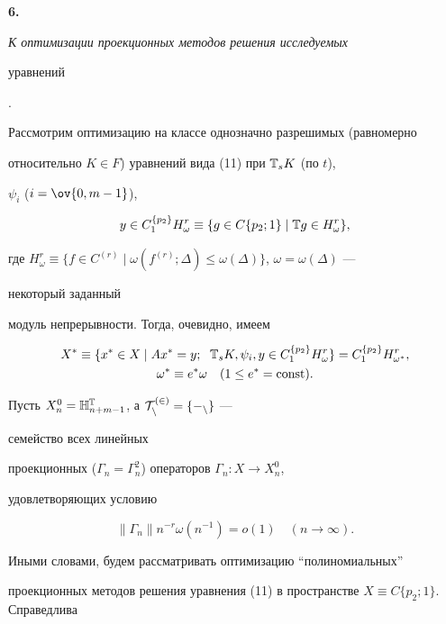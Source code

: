 {\bf 6.} {\it К оптимизации проекционных методов решения исследуемых 


уравнений}. 


Рассмотрим оптимизацию на классе однозначно разрешимых (равномерно 


относительно $K\in F$) уравнений вида (11) при $\Bbb T_s K$ (по $t$), 


$\psi_i$ ($i=\ov{0,m-1}$), 


$$ 


y\in C^{\{p_2\}}_1 H^r_\omega\equiv\{g\in C\{p_2;1\}\mid 


\Bbb T g\in H^r_\omega\}, 


$$ 


где $H^r_\omega\equiv\{f\in C^{(r)}\mid\omega(f^{(r)}; 


\Delta)\le\omega(\Delta)\}$, $\omega=\omega(\Delta)$ --- 


некоторый заданный 


модуль непрерывности. Тогда, очевидно, имеем 


\begin{gather*} 


X^*\equiv\{x^*\in X\mid A x^*=y;\ \; \Bbb T_s K,\psi_i, 


y\in C^{\{p_2\}}_1 H^r_\omega\}=C^{\{p_2\}}_1 H^r_{\omega^*},\\ 


\omega^*\equiv e^*\omega\quad (1\le e^*=\const). 


\end{gather*} 


 


Пусть $X^0_n=\Bbb H^{\Bbb T}_{n+m-1}$, а $\cal T^{(2)}_n=\{\Gamma_n\}$ --- 


семейство всех линейных 


проекционных ($\Gamma_n=\Gamma^2_n$) операторов $\Gamma_n:X\to X^0_n$, 


удовлетворяющих условию 


$$ 


\|\Gamma_n\|n^{-r}\omega(n^{-1})=o(1)\quad (n\to\infty). 


$$ 


Иными словами, будем рассматривать оптимизацию ``полиномиальных'' 


проекционных методов решения уравнения (11) в пространстве $X\equiv 


C\{p_2;1\}$. Справедлива 


 


